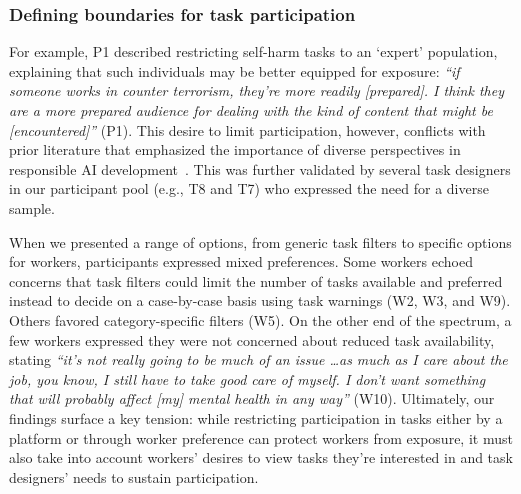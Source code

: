 \subsubsection{Defining boundaries for task participation}

 For example, P1 described restricting self-harm tasks to an `expert' population, explaining that such individuals may be better equipped for exposure: \textit{``if someone works in counter terrorism, they're more readily [prepared]. I think they are a more prepared audience for dealing with the kind of content that might be [encountered]''} (P1). This desire to limit participation, however, conflicts with prior literature that emphasized the importance of diverse perspectives in responsible AI development~\cite{qian2025locating, dalal2024provocation}. This was further validated by several task designers in our participant pool (e.g., T8 and T7) who expressed the need for a diverse sample. 

 When we presented a range of options, from generic task filters to specific options for workers, participants expressed mixed preferences. Some workers echoed concerns that task filters could limit the number of tasks available and preferred instead to decide on a case-by-case basis using task warnings (W2, W3, and W9). Others favored category-specific filters (W5). On the other end of the spectrum, a few workers expressed they were not concerned about reduced task availability, stating \textit{``it's not really going to be much of an issue \dots as much as I care about the job, you know, I still have to take good care of myself. I don't want something that will probably affect [my] mental health in any way''} (W10). Ultimately, our findings surface a key tension: while restricting participation in tasks either by a platform or through worker preference can protect workers from exposure, it must also take into account workers' desires to view tasks they're interested in and task designers' needs to sustain participation. 

